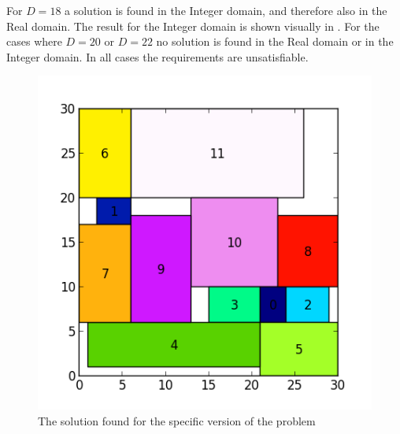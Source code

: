 For $D=18$ a solution is found in the Integer domain, and therefore also in the Real domain. The result for the Integer domain is shown visually in . For the cases where $D = 20$ or $D = 22$ no solution is found in the Real domain or in the Integer domain. In all cases the requirements are unsatisfiable.
\begin{figure}[!ht]
  \centering
  \includegraphics[width=\columnwidth]{2/chip_layout.eps}
  \caption{The solution found for the specific version of the problem}
  \label{fig:2_result}
\end{figure}
